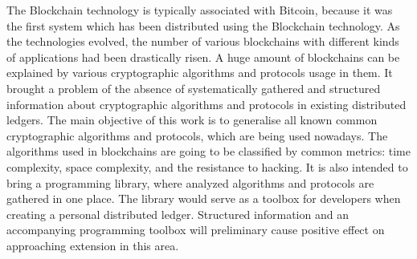 The Blockchain technology is typically associated with Bitcoin, because it was
the first system which has been distributed using the Blockchain technology.
As the technologies evolved, the number of various blockchains with different
kinds of applications had been drastically risen. A huge amount of blockchains
can be explained by various cryptographic algorithms and protocols usage in
them. It brought a problem of the absence of systematically gathered and
structured information about cryptographic algorithms and protocols in existing
distributed ledgers. The main objective of this work is to generalise all known
common cryptographic algorithms and protocols, which are being used nowadays.
The algorithms used in blockchains are going to be classified by common
metrics: time complexity, space complexity, and the resistance to hacking. It
is also intended to bring a programming library, where analyzed algorithms and
protocols are gathered in one place. The library would serve as a toolbox for
developers when creating a personal distributed ledger.  Structured information
and an accompanying programming toolbox will preliminary cause positive effect
on approaching extension in this area.
